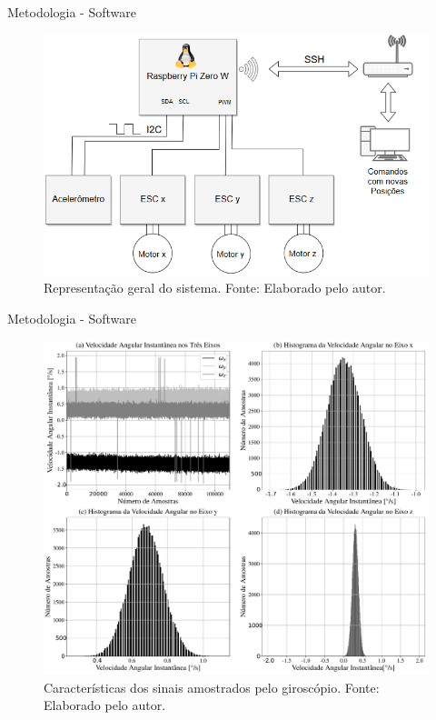 \documentclass{beamer}
\begin{document}
\begin{frame}{Metodologia - Software}
    \begin{figure}[HT]
		\begin{center}
		\captionsetup{justification=centering}
        \includegraphics[scale=.45]{../metodologia/img/comunicacao_projeto}
        \caption{Representação geral do sistema. \newline
        		 Fonte: Elaborado pelo autor.}
		\label{FIG_ADAPTATIVO}
        \end{center}
	\end{figure}
\end{frame}


\begin{frame}{Metodologia - Software}
    \begin{figure}[HT]
		\begin{center}
		\captionsetup{justification=centering}
        \includegraphics[scale=.17]{../metodologia/img/bias_correction}
        \caption{Características dos sinais amostrados pelo giroscópio. \newline
        		 Fonte: Elaborado pelo autor.}
		\label{FIG_ADAPTATIVO}
        \end{center}
	\end{figure}
\end{frame}
\end{document}
